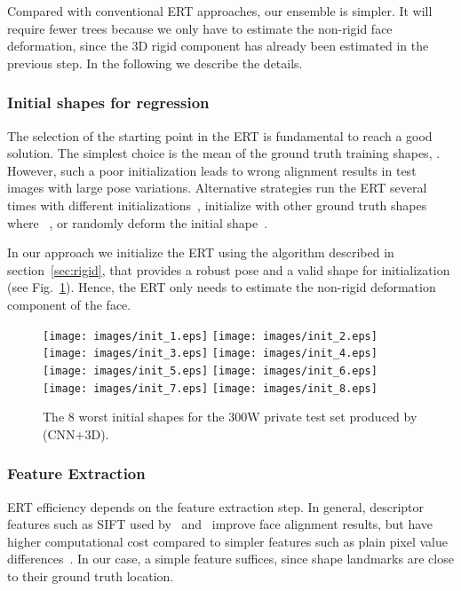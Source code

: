 \documentclass[11pt,twocolumn]{article}
\begin{document}
Compared with conventional ERT approaches, our ensemble is simpler. It will require fewer trees because we only have to estimate the non-rigid face deformation, since the 3D rigid component has already been estimated in the previous step. In the following we describe the details.

\subsubsection{Initial shapes for regression} 
The selection of the starting point in the ERT is fundamental to reach a good solution. The simplest choice is the mean of the ground truth training shapes, . However, such a poor initialization leads to wrong alignment results in test images with large pose variations. Alternative strategies run the ERT several times with different initializations~\citep{Burgos13},  initialize with other ground truth shapes  where ~\citep{Kazemi14}, or randomly deform the initial shape~\citep{Kowalski17}.

In our approach we initialize the ERT using the algorithm described in section~\ref{sec:rigid}, that  provides a robust pose and a valid shape for initialization (see Fig.~\ref{fig:initials}). Hence, the ERT only needs to estimate the non-rigid deformation component of the face.
\begin{figure}
\centering
\texttt{[image: images/init\_1.eps]}
\texttt{[image: images/init\_2.eps]}
\texttt{[image: images/init\_3.eps]}
\texttt{[image: images/init\_4.eps]}\\
\vspace{0.1cm}
\texttt{[image: images/init\_5.eps]}
\texttt{[image: images/init\_6.eps]}
\texttt{[image: images/init\_7.eps]}
\texttt{[image: images/init\_8.eps]}
\caption{The 8 worst initial shapes for the 300W private test set produced by  (CNN+3D).}
\label{fig:initials}
\end{figure}

\subsubsection{Feature Extraction}
ERT efficiency depends on the feature extraction step. In general, descriptor features such as SIFT used by~\cite{Xiong13} and~\cite{Zhu15} improve face alignment results, but have higher computational cost compared to simpler features such as plain pixel value differences~\citep{Cao14,Burgos13,Kazemi14,Ren16}. In our case, a simple feature suffices, since shape landmarks are close to their ground truth location.
\end{document}
